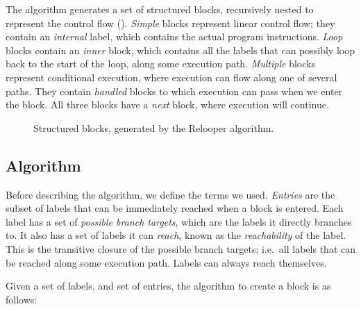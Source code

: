 \documentclass[00-main.tex]{subfiles}
\begin{document}
The algorithm generates a set of structured blocks, recursively nested to represent the control flow ().
\emph{Simple} blocks represent linear control flow; they contain an \emph{internal} label, which contains the actual program instructions.
\emph{Loop} blocks contain an \emph{inner} block, which contains all the labels that can possibly loop back to the start of the loop, along some execution path.
\emph{Multiple} blocks represent conditional execution, where execution can flow along one of several paths.
They contain \emph{handled} blocks to which execution can pass when we enter the block.
All three blocks have a \emph{next} block, where execution will continue.

\begin{figure}[ht]
  \centering
  \caption{Structured blocks, generated by the Relooper algorithm.}
  \label{fig:relooper output blocks structure}
\end{figure}

\subsection{Algorithm}

Before describing the algorithm, we define the terms we used.
\emph{Entries} are the subset of labels that can be immediately reached when a block is entered.
Each label has a set of \emph{possible branch targets}, which are the labels it directly branches to.
It also has a set of labels it can \emph{reach}, known as the \emph{reachability} of the label.
This is the transitive closure of the possible branch targets; i.e.\ all labels that can be reached along some execution path.
Labels can always reach themselves.

Given a set of labels, and set of entries, the algorithm to create a block is as follows:
\end{document}
